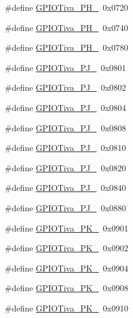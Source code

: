 \begin{DoxyCompactItemize}
\#define \hyperlink{_g_p_i_o_tiva_8h_ac08106e6c3cda616a5ebd0eaa5f6eb55}{G\+P\+I\+O\+Tiva\+\_\+\+P\+H\+\_}~0x0720
\item 
\#define \hyperlink{_g_p_i_o_tiva_8h_af5753cf621f368e90df20d13990e0c92}{G\+P\+I\+O\+Tiva\+\_\+\+P\+H\+\_}~0x0740
\item 
\#define \hyperlink{_g_p_i_o_tiva_8h_ae4ba05af3851e3724fa459f3549c9983}{G\+P\+I\+O\+Tiva\+\_\+\+P\+H\+\_}~0x0780
\item 
\#define \hyperlink{_g_p_i_o_tiva_8h_a7053030fa9fcd6caf8181f2c58408b00}{G\+P\+I\+O\+Tiva\+\_\+\+P\+J\+\_}~0x0801
\item 
\#define \hyperlink{_g_p_i_o_tiva_8h_acf4fd4488d5f43d65b1c11cfe3ab1000}{G\+P\+I\+O\+Tiva\+\_\+\+P\+J\+\_}~0x0802
\item 
\#define \hyperlink{_g_p_i_o_tiva_8h_a511b5f383c3d018ffb88af4f77a13137}{G\+P\+I\+O\+Tiva\+\_\+\+P\+J\+\_}~0x0804
\item 
\#define \hyperlink{_g_p_i_o_tiva_8h_a60a46459a74773762cee152b68dc7896}{G\+P\+I\+O\+Tiva\+\_\+\+P\+J\+\_}~0x0808
\item 
\#define \hyperlink{_g_p_i_o_tiva_8h_a024937af311314ec49c944fc3b7abd4e}{G\+P\+I\+O\+Tiva\+\_\+\+P\+J\+\_}~0x0810
\item 
\#define \hyperlink{_g_p_i_o_tiva_8h_ab15403553ced0e2b5bef8efc0d7892bf}{G\+P\+I\+O\+Tiva\+\_\+\+P\+J\+\_}~0x0820
\item 
\#define \hyperlink{_g_p_i_o_tiva_8h_a660f50d6cf098a7cdb73b0aaf2cfe069}{G\+P\+I\+O\+Tiva\+\_\+\+P\+J\+\_}~0x0840
\item 
\#define \hyperlink{_g_p_i_o_tiva_8h_a99c16fdc9d7ed67580f9cfd89819ab7b}{G\+P\+I\+O\+Tiva\+\_\+\+P\+J\+\_}~0x0880
\item 
\#define \hyperlink{_g_p_i_o_tiva_8h_aee1665dfa3329564d955725250e81046}{G\+P\+I\+O\+Tiva\+\_\+\+P\+K\+\_}~0x0901
\item 
\#define \hyperlink{_g_p_i_o_tiva_8h_a82b4b8a40d67113727a109ca133cfe4a}{G\+P\+I\+O\+Tiva\+\_\+\+P\+K\+\_}~0x0902
\item 
\#define \hyperlink{_g_p_i_o_tiva_8h_a72d70c13b849313e6126d420c99ac222}{G\+P\+I\+O\+Tiva\+\_\+\+P\+K\+\_}~0x0904
\item 
\#define \hyperlink{_g_p_i_o_tiva_8h_aa31f5a9212e9260810481d58ffdccb6e}{G\+P\+I\+O\+Tiva\+\_\+\+P\+K\+\_}~0x0908
\item 
\#define \hyperlink{_g_p_i_o_tiva_8h_a29546541c51b3e09e053981339df11ed}{G\+P\+I\+O\+Tiva\+\_\+\+P\+K\+\_}~0x0910
\item 

\end{DoxyCompactItemize}
